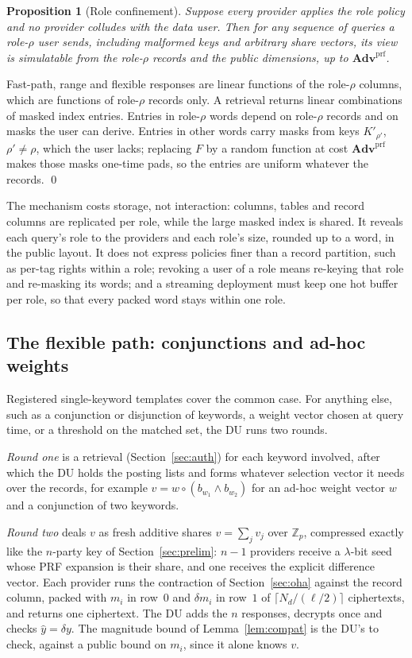 \documentclass[a4paper,fleqn]{cas-sc}
\newtheorem{proposition}{Proposition}
\newcommand{\advPRF}{\mathbf{Adv}^{\mathrm{prf}}}
\begin{document}
\begin{proposition}[Role confinement]
\label{prop:role}
Suppose every provider applies the role policy and no provider colludes with
the data user. Then for any sequence of queries a role-$\rho$ user sends,
including malformed keys and arbitrary share vectors, its view is simulatable
from the role-$\rho$ records and the public dimensions, up to
$\advPRF$.
\end{proposition}
\begin{pf}
Fast-path, range and flexible responses are linear functions of the
role-$\rho$ columns, which are functions of role-$\rho$ records only. A
retrieval returns linear combinations of masked index entries. Entries in
role-$\rho$ words depend on role-$\rho$ records and on masks the user can
derive. Entries in other words carry masks from keys $K'_{\rho'}$,
$\rho'\neq\rho$, which the user lacks; replacing $F$ by a random function at
cost $\advPRF$ makes those masks one-time pads, so the entries are uniform
whatever the records. \qed
\end{pf}

The mechanism costs storage, not interaction: columns, tables and record
columns are replicated per role, while the large masked index is shared. It
reveals each query's role to the providers and each role's size, rounded up to
a word, in the public layout. It does not express policies finer than a record
partition, such as per-tag rights within a role; revoking a user of a role
means re-keying that role and re-masking its words; and a streaming deployment
must keep one hot buffer per role, so that every packed word stays within one
role.

\subsection{The flexible path: conjunctions and ad-hoc weights}
\label{sec:flex}
Registered single-keyword templates cover the common case. For anything else,
such as a conjunction or disjunction of keywords, a weight vector chosen at
query time, or a threshold on the matched set, the DU runs two rounds.

\emph{Round one} is a retrieval (Section~\ref{sec:auth}) for each keyword
involved, after which the DU holds the posting lists and forms whatever
selection vector it needs over the records, for example
$v=w\circ(b_{w_1}\wedge b_{w_2})$ for an ad-hoc weight vector $w$ and a
conjunction of two keywords.

\emph{Round two} deals $v$ as fresh additive shares $v=\sum_jv_j$ over
$\mathbb{Z}_p$, compressed exactly like the $n$-party key of
Section~\ref{sec:prelim}: $n-1$ providers receive a $\lambda$-bit seed whose
PRF expansion is their share, and one receives the explicit difference vector.
Each provider runs the contraction of Section~\ref{sec:oha} against the record
column, packed with $m_i$ in row~$0$ and $\delta m_i$ in row~$1$ of
$\lceil N_d/(\ell/2)\rceil$ ciphertexts, and returns one ciphertext. The DU
adds the $n$ responses, decrypts once and checks $\hat y=\delta y$. The
magnitude bound of Lemma~\ref{lem:compat} is the DU's to check, against a
public bound on $m_i$, since it alone knows $v$.
\end{document}
